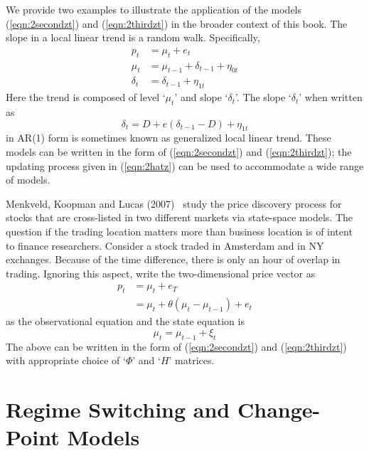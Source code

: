 We provide two examples to illustrate the application of the models (\ref{eqn:2secondzt}) and (\ref{eqn:2thirdzt}) in the broader context of this book. The slope in a local linear trend is a random walk. Specifically,
	\begin{equation}\label{eqn:randomwalk}
	\begin{split}
	p_t&= \mu_t+ e_t \\
	\mu_t&= \mu_{t-1} + \delta_{t-1} + \eta_{0t} \\
	\delta_t&=\delta_{t-1}+\eta_{1t}
	\end{split}
	\end{equation}
Here the trend is composed of level `$\mu_t$' and slope `$\delta_t$'. The slope `$\delta_t$' when written as 
	\begin{equation}\label{eqn:slopewritten}
	\delta_t= D+ e(\delta_{t-1} - D)+ \eta_{1t}
	\end{equation}
in AR(1) form is sometimes known as generalized local linear trend. These models can be written in the form of (\ref{eqn:2secondzt}) and (\ref{eqn:2thirdzt}); the updating process given in (\ref{eqn:2hatz}) can be used to accommodate a wide range of models.


Menkveld, Koopman and Lucas (2007)~\cite{menkkoop} study the price discovery process for stocks that are cross-listed in two different markets via state-space models. The question if the trading location matters more than business location is of intent to finance researchers. Consider a stock traded in Amsterdam and in NY exchanges. Because of the time difference, there is only an hour of overlap in trading. Ignoring this aspect, write the two-dimensional price vector as
	\begin{equation}
	\begin{split}
	p_t&=\mu_t + e_T \\
	&=\mu_t + \theta(\mu_t-\mu_{t-1}) + e_t
	\end{split}
	\end{equation}
as the observational equation and the state equation is
	\begin{equation}
	\mu_t= \mu_{t-1} + \xi_t
	\end{equation}
The above can be written in the form of (\ref{eqn:2secondzt}) and (\ref{eqn:2thirdzt}) with appropriate choice of `$\Phi$' and `$H$' matrices. 


\section{Regime Switching and Change-Point Models}


